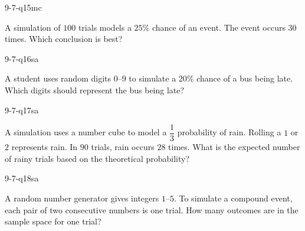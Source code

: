 \begin{practiceQuestion}{9-7-q15}{mc}
\begin{questionText}
A simulation of $100$ trials models a $25\%$ chance of an event. The event occurs $30$ times. Which conclusion is best?
\end{questionText}
\end{practiceQuestion}


\begin{practiceQuestion}{9-7-q16}{sa}
\begin{questionText}
A student uses random digits $0$--$9$ to simulate a $20\%$ chance of a bus being late. Which digits should represent the bus being late?
\end{questionText}
\end{practiceQuestion}

\begin{practiceQuestion}{9-7-q17}{sa}
\begin{questionText}
A simulation uses a number cube to model a $\dfrac{1}{3}$ probability of rain. Rolling a $1$ or $2$ represents rain. In $90$ trials, rain occurs $28$ times. What is the expected number of rainy trials based on the theoretical probability?
\end{questionText}
\end{practiceQuestion}

\begin{practiceQuestion}{9-7-q18}{sa}
\begin{questionText}
A random number generator gives integers $1$--$5$. To simulate a compound event, each pair of two consecutive numbers is one trial. How many outcomes are in the sample space for one trial?
\end{questionText}
\end{practiceQuestion}

